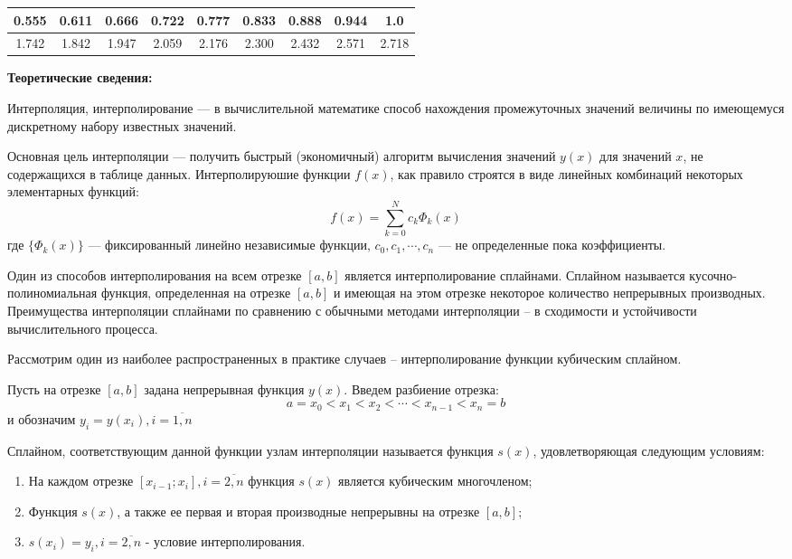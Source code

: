 \documentclass [12pt]{article}
\begin{document}
\begin{table}[h]
\begin{center}
\begin{tabular}{|c|c|c|c|c|c|c|c|c|}
\hline
0.555 & 0.611 & 0.666 & 0.722 & 0.777 & 0.833 & 0.888 & 0.944 & 1.0 \\
\hline
1.742 & 1.842 & 1.947 & 2.059 & 2.176 & 2.300 & 2.432 & 2.571 & 2.718 \\
\hline
\end{tabular}
\end{center}
\end{table}

\textbf{Теоретические сведения:}

Интерполяция, интерполирование — в вычислительной математике способ нахождения промежуточных значений величины по имеющемуся дискретному набору известных значений.

Основная цель интерполяции — получить быстрый (экономичный) алгоритм вычисления значений $y(x)$ для значений $x$, не содержащихся в таблице данных.
Интерполируюшие функции $f(x)$, как правило строятся в виде линейных комбинаций некоторых элементарных функций:
$$f(x)=\sum_{k=0}^N {c_k\Phi_k(x)}$$
где $\{\Phi_k(x)\}$ — фиксированный линейно независимые функции, $c_0, c_1, \cdots, c_n$ — не определенные пока коэффициенты.

Один из способов интерполирования на всем отрезке $[a, b]$ является интерполирование сплайнами.
Сплайном называется кусочно-полиномиальная функция, определенная на отрезке $[a, b]$ и имеющая на этом отрезке некоторое количество непрерывных производных. Преимущества интерполяции сплайнами по сравнению с обычными методами интерполяции – в сходимости и устойчивости вычислительного процесса.

Рассмотрим один из наиболее распространенных в практике случаев – интерполирование функции кубическим сплайном.

Пусть на отрезке $[a, b]$ задана непрерывная функция $y(x)$. Введем разбиение отрезка:
$$ a = x_0 < x_1 < x_2 < \cdots < x_{n-1} < x_n = b $$ и обозначим $y_i=y(x_i),  i = \overline{1,n}$

Сплайном, соответствующим данной функции узлам интерполяции называется функция $s(x)$, удовлетворяющая следующим условиям:
\begin{enumerate}
\item На каждом отрезке $[x_{i-1};x_{i}],  i = \overline{2,n}$ функция $s(x)$ является кубическим многочленом;
\item Функция $s(x)$, а также ее первая и вторая производные непрерывны на отрезке $[a, b]$;
\item $s(x_i)=y_i,  i = \overline{2,n}$ - условие интерполирования.
\end{enumerate}
\end{document}
